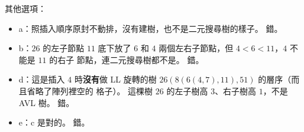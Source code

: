 \begin{pastsoln}
其他選項：
\begin{itemize}
\item a：照插入順序原封不動排，沒有建樹，也不是二元搜尋樹的樣子。 錯。
\item b：$26$ 的左子節點 $11$ 底下放了 $6$ 和 $4$ 兩個左右子節點，但 $4 < 6 < 11$，$4$ 不能是 $11$ 的右子
節點，連二元搜尋樹都不是。 錯。
\item d：這是插入 $4$ 時\textbf{沒有}做 LL 旋轉的樹 $26(8(6(4, 7), 11), 51)$ 的層序（而且省略了陣列裡空的
格子）。 這棵樹 $26$ 的左子樹高 $3$、右子樹高 $1$，不是 AVL 樹。 錯。
\item e：c 是對的。 錯。
\end{itemize}
\end{pastsoln}
